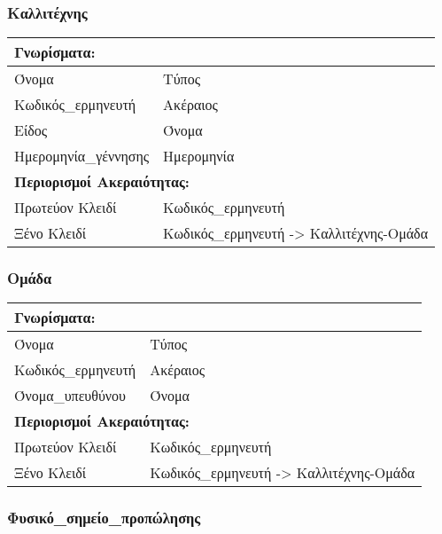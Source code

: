 \subsubsection{Καλλιτέχνης}

\begin{tabular}{|p{6cm}|p{8cm}|}
  \multicolumn{2}{l}{\textbf{Γνωρίσματα:}}                       \\ \hline
  Όνομα                & Τύπος                                   \\ \hline
  Κωδικός\_ερμηνευτή   & Ακέραιος                                \\ \hline
  Είδος                & Όνομα                                   \\ \hline
  Ημερομηνία\_γέννησης & Ημερομηνία                              \\ \hline
  \multicolumn{2}{l}{\textbf{Περιορισμοί Ακεραιότητας:}}         \\ \hline
  Πρωτεύον Κλειδί      & Κωδικός\_ερμηνευτή                      \\ \hline
  Ξένο Κλειδί          & Κωδικός\_ερμηνευτή -> Καλλιτέχνης-Ομάδα \\ \hline
\end{tabular}

\subsubsection{Ομάδα}

\begin{tabular}{|p{6cm}|p{8cm}|}
  \multicolumn{2}{l}{\textbf{Γνωρίσματα:}}                     \\ \hline
  Όνομα              & Τύπος                                   \\ \hline
  Κωδικός\_ερμηνευτή & Ακέραιος                                \\ \hline
  Όνομα\_υπευθύνου   & Όνομα                                   \\ \hline
  \multicolumn{2}{l}{\textbf{Περιορισμοί Ακεραιότητας:}}       \\ \hline
  Πρωτεύον Κλειδί    & Κωδικός\_ερμηνευτή                      \\ \hline
  Ξένο Κλειδί        & Κωδικός\_ερμηνευτή -> Καλλιτέχνης-Ομάδα \\ \hline
\end{tabular}


\subsubsection{Φυσικό\_σημείο\_προπώλησης}

